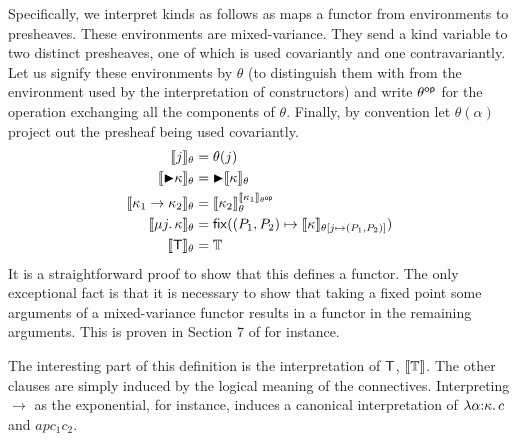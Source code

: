 Specifically, we interpret kinds as follows as maps a functor from
environments to presheaves. These environments are mixed-variance.
They send a kind variable to two distinct presheaves, one of which is
used covariantly and one contravariantly. Let us signify these
environments by $\theta$ (to distinguish them with from the
environment used by the interpretation of constructors) and write
$\theta^{\mathsf{op}}$ for the operation exchanging all the components of
$\theta$. Finally, by convention let $\theta(\alpha)$ project out the
presheaf being used covariantly.
\begin{align*}
  \llbracket j \rrbracket_\theta &= \theta(j)\\
  \llbracket {\blacktriangleright} \kappa \rrbracket_\theta &= {\blacktriangleright} \llbracket \kappa \rrbracket_\theta\\
  \llbracket \kappa_1 \to \kappa_2 \rrbracket_\theta &= \llbracket \kappa_2 \rrbracket_\theta^{\llbracket \kappa_1 \rrbracket_{\theta^{\mathsf{op}}}}\\
  \llbracket \mu j.\, \kappa \rrbracket_\theta &= \mathsf{fix}((P_1, P_2) \mapsto \llbracket \kappa \rrbracket_{\theta[j \mapsto (P_1, P_2)]})\\
  \llbracket \mathsf{T} \rrbracket_\theta &= \mathbb{T}\\
\end{align*}
It is a straightforward proof to show that this defines a functor. The
only exceptional fact is that it is necessary to show that taking a
fixed point some arguments of a mixed-variance functor results in a
functor in the remaining arguments. This is proven in Section 7 of
\citet{Birkedal:steps:10} for instance.

The interesting part of this definition is the interpretation of
$\mathsf{T}$, $\llbracket \mathbb{T} \rrbracket$. The other clauses are simply induced by the
logical meaning of the connectives. Interpreting $\to$ as the
exponential, for instance, induces a canonical interpretation of
$\lambda \alpha {:} \kappa.\, c$ and $ap{c_1}{c_2}$.

